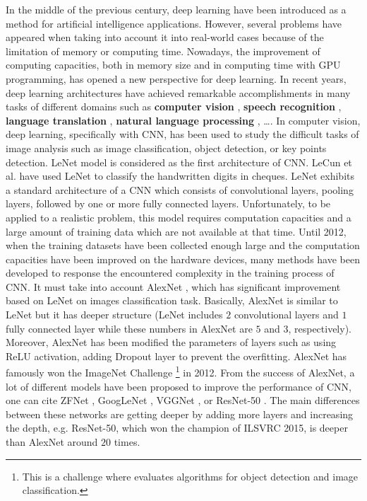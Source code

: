 \documentclass[review]{elsarticle}
\begin{document}
In the middle of the previous century, deep learning \cite{lecun2015deep} have been introduced as a method for artificial intelligence applications. However, several problems have appeared when taking into account it into real-world cases because of the limitation of memory or computing time. Nowadays, the improvement of computing capacities, both in memory size and in computing time with GPU programming, has opened a new perspective for deep learning. In recent years, deep learning architectures have achieved remarkable accomplishments in many tasks of different domains such as \textbf{computer vision} \cite{lecun1998gradient, krizhevsky2012imagenet,  szegedy2015going,farabet2013learning,li2015convolutional}, \textbf{speech recognition} \cite{mikolov2011strategies, hinton2012deep}, \textbf{language translation} \cite{jean2014using, sutskever2014sequence}, \textbf{natural language processing} \cite{lecun2015deep, collobert2011natural, collobert2008unified}, \ldots. In computer vision, deep learning, specifically with CNN, has been used to study the difficult tasks of image analysis such as image classification, object detection, or key points detection. LeNet \cite{lecun1998gradient} model is considered as the first architecture of CNN. LeCun et al. \cite{lecun1998gradient} have used LeNet to classify the handwritten digits in cheques. LeNet exhibits a standard architecture of a CNN which consists of convolutional layers, pooling layers, followed by one or more fully connected layers. Unfortunately, to be applied to a realistic problem, this model requires computation capacities and a large amount of training data which are not available at that time. Until 2012, when the training datasets have been collected enough large and the computation capacities have been improved on the hardware devices, many methods have been developed to response the encountered complexity in the training process of CNN. It must take into account AlexNet \cite{krizhevsky2012imagenet}, which has significant improvement based on LeNet \cite{lecun1998gradient} on images classification task. Basically, AlexNet \cite{krizhevsky2012imagenet} is similar to LeNet \cite{lecun1998gradient} but it has deeper structure (LeNet includes $2$ convolutional layers and $1$ fully connected layer while these numbers in AlexNet are $5$ and $3$, respectively). Moreover, AlexNet has been modified the parameters of layers such as using ReLU activation, adding Dropout layer to prevent the overfitting. AlexNet has famously won the ImageNet Challenge \footnote{This is a challenge where evaluates algorithms for object detection and image classification.} in 2012. From the success of AlexNet, a lot of different models have been proposed to improve the performance of CNN, one can cite ZFNet  \cite{zeiler2014visualizing}, GoogLeNet \cite{szegedy2015going}, VGGNet \cite{simonyan2014very}, or ResNet-50 \cite{he2016deep}. The main differences between these networks are getting deeper by adding more layers and increasing the depth, e.g. ResNet-50, which won the champion of ILSVRC 2015, is deeper than AlexNet around $20$ times.
 
\end{document}
